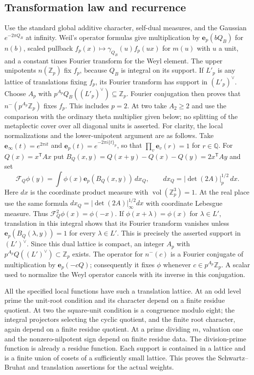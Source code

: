 \subsection{Transformation law and recurrence}
Use the standard global additive character, self-dual measures,
and the Gaussian $e^{-2\pi Q_B}$ at infinity.  Weil's operator
formulas \cite[I.13]{weil} give multiplication by $\mathbf e_p(bQ_B)$ for
$n(b)$, scaled pullback $f_p(x)\mapsto\gamma_{Q_B}(u)f_p(ux)$ for
$m(u)$ with $u$ a unit, and a constant times Fourier transform
for the Weyl element.  The upper unipotents $n(\mathbb Z_p)$ fix
$f_p$, because $Q_B$ is integral on its support.  If $L'_p$ is any
lattice of translations fixing $f_p$, its Fourier transform has
support in $(L'_p)^\vee$.  Choose $A_p$ with
$p^{A_p}Q_B((L'_p)^\vee)\subseteq\mathbb Z_p$.  Fourier conjugation
then proves that $n^-(p^{A_p}\mathbb Z_p)$ fixes $f_p$.
This includes $p=2$. At two take $A_2\ge2$ and use the comparison
with the ordinary theta multiplier given below; no splitting of
the metaplectic cover over all diagonal units is asserted.
For clarity, the local normalizations and the lower-unipotent
argument are as follows. Take
$\mathbf e_\infty(t)=e^{2\pi it}$ and
$\mathbf e_p(t)=e^{-2\pi i\{t\}_p}$, so that
$\prod_v\mathbf e_v(r)=1$ for $r\in\mathbb Q$.
For $Q(x)=x^{\mathsf T}Ax$ put
$B_Q(x,y)=Q(x+y)-Q(x)-Q(y)=2x^{\mathsf T}Ay$ and set
\[
 \mathcal F_Q\phi(y)=\int\phi(x)\mathbf e_p(B_Q(x,y))\,dx_Q,
 \qquad dx_Q=|\det(2A)|_p^{1/2}\,dx.
\]
Here $dx$ is the coordinate product measure with
$\operatorname{vol}(\mathbb Z_p^3)=1$.
At the real place use the same formula
$dx_Q=|\det(2A)|_\infty^{1/2}dx$ with coordinate Lebesgue measure.
Thus $\mathcal F_Q^2\phi(x)=\phi(-x)$.
If $\phi(x+\lambda)=\phi(x)$ for $\lambda\in L'$, translation
in this integral shows that its Fourier transform vanishes unless
$\mathbf e_p(B_Q(\lambda,y))=1$ for every $\lambda\in L'$.
This is precisely the asserted support in $(L')^\vee$.
Since this dual lattice is compact, an integer $A_p$ with
$p^{A_p}Q((L')^\vee)\subset\mathbb Z_p$ exists. The operator
for $n^-(c)$ is a Fourier conjugate of multiplication by
$\mathbf e_p(-cQ)$; consequently it fixes $\phi$ whenever
$c\in p^{A_p}\mathbb Z_p$. A scalar used to normalize the Weyl
operator cancels with its inverse in this conjugation.

All the specified local functions have such a translation lattice.
At an odd level prime the unit-root condition and its character
depend on a finite residue quotient. At two the square-unit
condition is a congruence modulo eight; the integral projectors
selecting the cyclic quotient, and the finite root character,
again depend on a finite residue quotient. At a prime dividing
$m$, valuation one and the nonzero-nilpotent sign depend on finite
residue data. The division-prime function is already a residue
function. Each support is contained in a lattice and is a finite
union of cosets of a sufficiently small lattice. This proves the
Schwartz--Bruhat and translation assertions for the actual weights.

